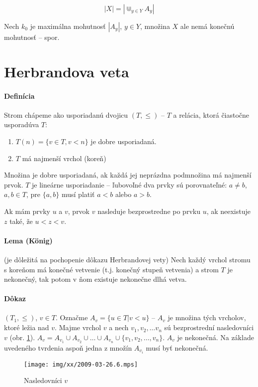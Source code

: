 $$ |X| = \left|\Cup_{y\in Y} A_y \right|$$

Nech $k_0$ je maximálna mohutnosť $|A_y|$, $y\in Y$, množina $X$ ale nemá
konečnú mohutnosť -- spor.
\section{Herbrandova veta}

\paragraph{Definícia} Strom chápeme ako usporiadanú dvojicu $(T,\leq)$ -- $T$ a
relácia, ktorá čiastočne usporadúva $T$:
\begin{enumerate}
	\item $T(n)=\{v\in T, v<n\}$ je dobre usporiadaná.
	\item $T$ má najmenší vrchol (koreň)
\end{enumerate}

Množina je dobre usporiadaná, ak každá jej neprázdna podmnožina má najmenší
prvok. $T$ je lineárne usporiadanie -- ľubovoľné dva prvky sú porovnateľné:
$a \neq b$, $a,b\in T$, pre $\{a, b\}$ musí platiť $a<b$ alebo $a>b$.

\par Ak mám prvky $u$ a $v$, prvok $v$ nasleduje bezprostredne po prvku $u$, ak
neexistuje $z$ také, že $u < z < v$.

\paragraph{Lema (K\"onig)} (je dôležitá na pochopenie dôkazu Herbrandovej vety)
Nech každý vrchol stromu s koreňom má konečné vetvenie (t.j. konečný stupeň
vetvenia) a strom $T$ je nekonečný, tak potom v ňom existuje nekonečne dlhá
vetva.

\paragraph{Dôkaz} $(T_1,\leq)$, $v \in T$. Označme $A_v = \{ u \in T | v <u
\}$ -- $A_v$ je množina tých vrcholov, ktoré ležia nad $v$. Majme vrchol $v$ a
nech $v_1, v_2, \ldots v_n$ sú bezprostrední nasledovníci $v$ (obr.
\ref{0326_successors}). $A_v = A_{v_1} \cup A_{v_2} \cup \ldots \cup A_{v_n}
\cup \{v_1, v_2, \ldots, v_n\}$. $A_v$ je nekonečná. Na základe uvedeného
tvrdenia aspoň jedna z množín $A_{v_i}$ musí byť nekonečná.

\begin{figure}[h]
	\centering\texttt{[image: img/xx/2009-03-26.6.mps]}
	\caption{Nasledovníci $v$}
	\label{0326_successors}
\end{figure}

